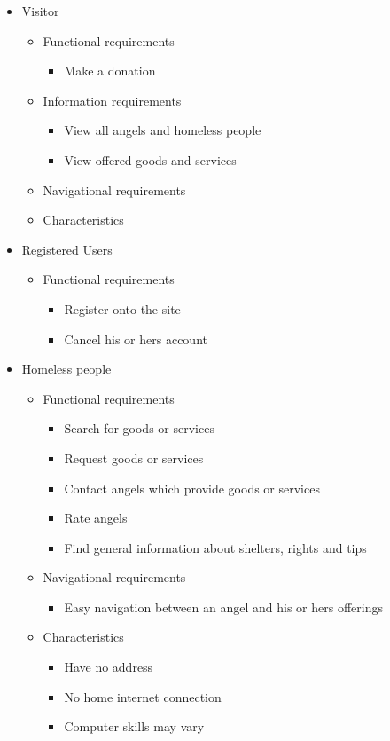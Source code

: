 \documentclass[a4paper]{report}
\begin{document}
\begin{itemize}
\item Visitor

\begin{itemize}
\item Functional requirements
\begin{itemize}
	\item Make a donation
\end{itemize}
\item Information requirements
\begin{itemize}
	\item View all angels and homeless people
	\item View offered goods and services
\end{itemize}
\item Navigational requirements
\item Characteristics
\end{itemize}


\item Registered Users
\begin{itemize}
\item Functional requirements
\begin{itemize}
	\item Register onto the site
	\item Cancel his or hers account
\end{itemize}
\end{itemize}

\item Homeless people
\begin{itemize}
\item Functional requirements
\begin{itemize}
	\item Search for goods or services
	\item Request goods or services
	\item Contact angels which provide goods or services
	\item Rate angels
	\item Find general information about shelters, rights and tips
\end{itemize}
\item Navigational requirements
\begin{itemize}
	\item Easy navigation between an angel and his or hers offerings
\end{itemize}
\item Characteristics
\begin{itemize}
	\item Have no address
	\item No home internet connection
	\item Computer skills may vary
\end{itemize}
\end{itemize}


\end{itemize}
\end{document}
